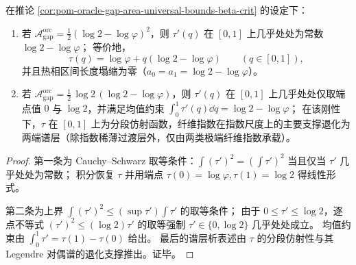 \begin{theorem}\label{thm:pom-oracle-gap-area-rigidity}
在推论 \ref{cor:pom-oracle-gap-area-universal-bounds-beta-crit} 的设定下：
\begin{enumerate}
  \item 若 \(\mathcal{A}^{\mathrm{orc}}_{\mathrm{gap}}=\frac12(\log 2-\log\varphi)^2\)，则 \(\tau'(q)\) 在 \([0,1]\) 上几乎处处为常数 \(\log 2-\log\varphi\)；
  等价地，
  \[
  \tau(q)=\log\varphi+q(\log 2-\log\varphi)\qquad(q\in[0,1]),
  \]
  并且热相区间长度塌缩为零（\(a_0=a_1=\log 2-\log\varphi\)）。
  \item 若 \(\mathcal{A}^{\mathrm{orc}}_{\mathrm{gap}}=\frac12\,\log 2\,(\log 2-\log\varphi)\)，则 \(\tau'(q)\) 在 \([0,1]\) 上几乎处处仅取端点值 \(0\) 与 \(\log 2\)，并满足均值约束
  \(
  \int_0^1\tau'(q)\dd q=\log 2-\log\varphi
  \)；
  在该刚性下，\(\tau\) 在 \([0,1]\) 上为分段仿射函数，纤维指数在指数尺度上的主要支撑退化为两端谱层（除指数稀薄过渡层外，仅由两类极端纤维指数承载）。
\end{enumerate}
\end{theorem}
\begin{proof}
第一条为 Cauchy--Schwarz 取等条件：\(\int(\tau')^2=(\int\tau')^2\) 当且仅当 \(\tau'\) 几乎处处为常数；
积分恢复 \(\tau\) 并用端点 \(\tau(0)=\log\varphi,\tau(1)=\log 2\) 得线性形式。
\par
第二条为上界 \(\int(\tau')^2\le (\sup\tau')\int\tau'\) 的取等条件；
由于 \(0\le\tau'\le\log 2\)，逐点不等式 \((\tau')^2\le(\log 2)\tau'\) 的取等强制 \(\tau'\in\{0,\log 2\}\) 几乎处处成立。
均值约束由 \(\int_0^1\tau'=\tau(1)-\tau(0)\) 给出。
最后的谱层析表述由 \(\tau\) 的分段仿射性与其 Legendre 对偶谱的退化支撑推出。证毕。
\end{proof}

\endinput
